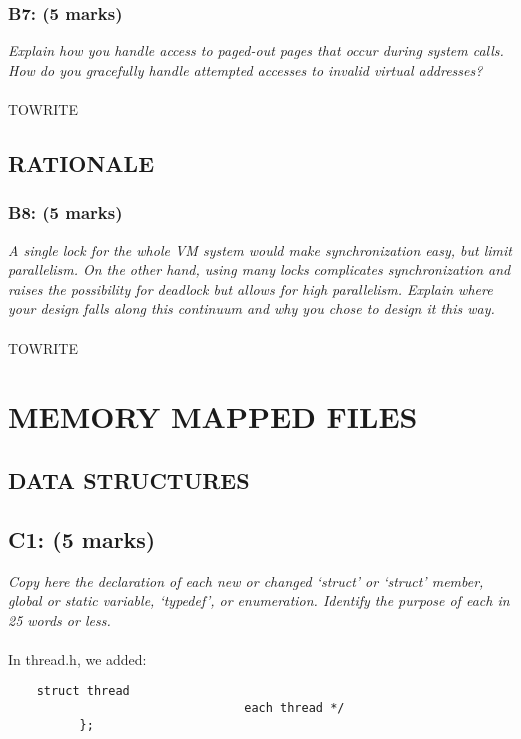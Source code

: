 \documentclass{article}
\begin{document}
\subsubsection*{B7: (5 marks) }
\textit{Explain how you handle access to paged-out pages that occur
during system calls. How do you gracefully handle attempted
accesses to invalid virtual addresses?}
\\ \\
TOWRITE

\subsection{RATIONALE}

\subsubsection*{B8: (5 marks) }
\textit{A single lock for the whole VM system would make
synchronization easy, but limit parallelism.  On the other hand,
using many locks complicates synchronization and raises the
possibility for deadlock but allows for high parallelism.  Explain
where your design falls along this continuum and why you chose to
design it this way.}
\\ \\
TOWRITE


\section{MEMORY MAPPED FILES}

\subsection{DATA STRUCTURES}

\subsection*{C1: (5 marks) }

\textit{Copy here the declaration of each new or changed ‘struct’ or ‘struct’
member, global or static variable, ‘typedef’, or enumeration. Identify the
purpose of each in 25 words or less.}
\\\\
In thread.h, we added:
\begin{lstlisting}
    struct thread
                                 each thread */
          };
\end{lstlisting}
\end{document}
